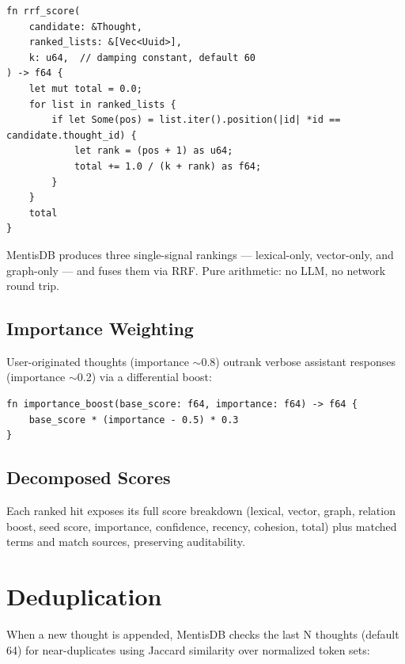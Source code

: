 \documentclass[11pt,a4paper]{article}
\begin{document}
\begin{lstlisting}
fn rrf_score(
    candidate: &Thought,
    ranked_lists: &[Vec<Uuid>],
    k: u64,  // damping constant, default 60
) -> f64 {
    let mut total = 0.0;
    for list in ranked_lists {
        if let Some(pos) = list.iter().position(|id| *id == candidate.thought_id) {
            let rank = (pos + 1) as u64;
            total += 1.0 / (k + rank) as f64;
        }
    }
    total
}
\end{lstlisting}

MentisDB produces three single-signal rankings — lexical-only, vector-only, and
graph-only — and fuses them via RRF. Pure arithmetic: no LLM, no network round trip.

\subsection{Importance Weighting}

User-originated thoughts (importance $\sim$0.8) outrank verbose assistant responses
(importance $\sim$0.2) via a differential boost:

\begin{lstlisting}
fn importance_boost(base_score: f64, importance: f64) -> f64 {
    base_score * (importance - 0.5) * 0.3
}
\end{lstlisting}

\subsection{Decomposed Scores}

Each ranked hit exposes its full score breakdown (lexical, vector, graph, relation boost,
seed score, importance, confidence, recency, cohesion, total) plus matched terms and match
sources, preserving auditability.

\section{Deduplication}

When a new thought is appended, MentisDB checks the last N thoughts (default 64) for
near-duplicates using Jaccard similarity over normalized token sets:
\end{document}
